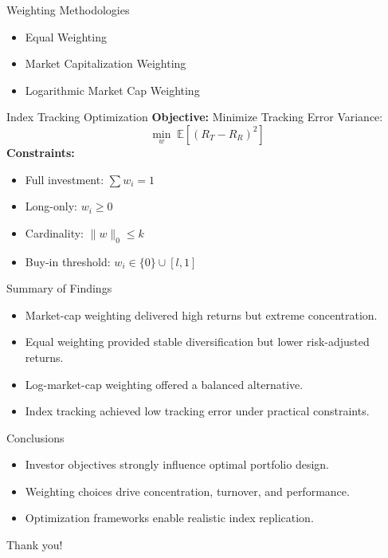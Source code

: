 \documentclass{beamer}
\begin{document}
	\begin{frame}{Weighting Methodologies}
		\begin{itemize}
			\item Equal Weighting
			\item Market Capitalization Weighting
			\item Logarithmic Market Cap Weighting
		\end{itemize}
	\end{frame}
	
	\begin{frame}{Index Tracking Optimization}
		\textbf{Objective:} Minimize Tracking Error Variance:
		\[
		\min_w \; \mathbb{E}[(R_T - R_R)^2]
		\]
		\textbf{Constraints:}
		\begin{itemize}
			\item Full investment: \( \sum w_i = 1 \)
			\item Long-only: \( w_i \ge 0 \)
			\item Cardinality: \( \|w\|_0 \le k \)
			\item Buy-in threshold: \( w_i \in \{0\} \cup [l,1] \)
		\end{itemize}
	\end{frame}
	
	\begin{frame}{Summary of Findings}
		\begin{itemize}
			\item Market-cap weighting delivered high returns but extreme concentration.
			\item Equal weighting provided stable diversification but lower risk-adjusted returns.
			\item Log-market-cap weighting offered a balanced alternative.
			\item Index tracking achieved low tracking error under practical constraints.
		\end{itemize}
	\end{frame}
	
	\begin{frame}{Conclusions}
		\begin{itemize}
			\item Investor objectives strongly influence optimal portfolio design.
			\item Weighting choices drive concentration, turnover, and performance.
			\item Optimization frameworks enable realistic index replication.
		\end{itemize}
	\end{frame}
	
	\begin{frame}
		\centering \Large Thank you!
	\end{frame}
	
\end{document}
